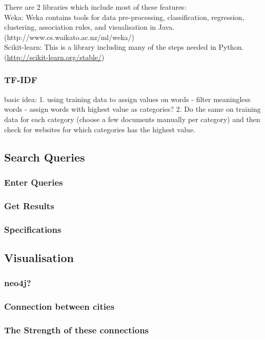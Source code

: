 There are 2 libraries which include most of these features: \\
Weka: Weka contains tools for data pre-processing, classification, regression, clustering, association rules, and visualisation in Java. (http://www.cs.waikato.ac.nz/ml/weka/) \\ 

Scikit-learn: This is a library including many of the steps needed in Python. (\url{http://scikit-learn.org/stable/})

\subsubsection{TF-IDF}
basic idea: 1. using training data to assign values on words - filter meaningless words - assign words with highest value as categories? 2. Do the same on training data for each category (choose a few documents manually per category) and then check for websites for which categories has the highest value.

\subsection{Search Queries}

\subsubsection{Enter Queries}
\subsubsection{Get Results}
\subsubsection{Specifications}

\subsection{Visualisation}
\subsubsection{neo4j?}

\subsubsection{Connection between cities}
\subsubsection{The Strength of these connections}